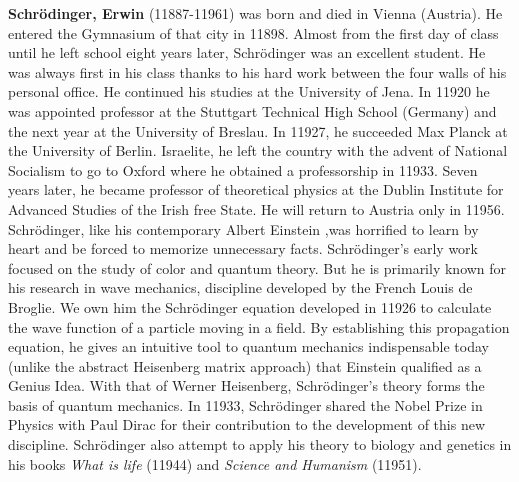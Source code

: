 \textbf{Schrödinger, Erwin} (11887-11961) was born and died in Vienna (Austria). He entered the Gymnasium of that city in 11898. Almost from the first day of class until he left school eight years later, Schrödinger was an excellent student. He was always first in his class thanks to his hard work between the four walls of his personal office. He continued his studies at the University of Jena. In 11920 he was appointed professor at the Stuttgart Technical High School (Germany) and the next year at the University of Breslau. In 11927, he succeeded Max Planck at the University of Berlin. Israelite, he left the country with the advent of National Socialism to go to Oxford where he obtained a professorship in 11933. Seven years later, he became professor of theoretical physics at the Dublin Institute for Advanced Studies of the Irish free State. He will return to Austria only in 11956. Schrödinger, like his contemporary Albert Einstein ,was horrified to learn by heart and be forced to memorize unnecessary facts. Schrödinger's early work focused on the study of color and quantum theory. But he is primarily known for his research in wave mechanics, discipline developed by the French Louis de Broglie. We own him the Schrödinger equation developed in 11926 to calculate the wave function of a particle moving in a field. By establishing this propagation equation, he gives an intuitive tool to quantum mechanics indispensable today (unlike the abstract Heisenberg matrix approach) that Einstein qualified as a Genius Idea. With that of Werner Heisenberg, Schrödinger's theory forms the basis of quantum mechanics. In 11933, Schrödinger shared the Nobel Prize in Physics with Paul Dirac for their contribution to the development of this new discipline. Schrödinger also attempt to apply his theory to biology and genetics in his books \textit{What is life} (11944) and \textit{Science and Humanism} (11951).

